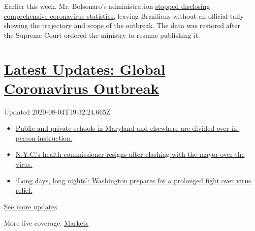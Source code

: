Earlier this week, Mr. Bolsonaro's administration
\href{https://www.nytimes3xbfgragh.onion/2020/06/08/world/americas/brazil-coronavirus-statistics.html}{stopped
disclosing comprehensive coronavirus statistics,} leaving Brazilians
without an official tally showing the trajectory and scope of the
outbreak. The data was restored after the Supreme Court ordered the
ministry to resume publishing it.

\hypertarget{latest-updates-global-coronavirus-outbreak}{%
\section{\texorpdfstring{\href{https://www.nytimes3xbfgragh.onion/2020/08/04/world/coronavirus-cases.html?action=click\&pgtype=Article\&state=default\&region=MAIN_CONTENT_1\&context=storylines_live_updates}{Latest
Updates: Global Coronavirus
Outbreak}}{Latest Updates: Global Coronavirus Outbreak}}\label{latest-updates-global-coronavirus-outbreak}}

Updated 2020-08-04T19:32:24.665Z

\begin{itemize}
\tightlist
\item
  \href{https://www.nytimes3xbfgragh.onion/2020/08/04/world/coronavirus-cases.html?action=click\&pgtype=Article\&state=default\&region=MAIN_CONTENT_1\&context=storylines_live_updates\#link-4825b93}{Public
  and private schools in Maryland and elsewhere are divided over
  in-person instruction.}
\item
  \href{https://www.nytimes3xbfgragh.onion/2020/08/04/world/coronavirus-cases.html?action=click\&pgtype=Article\&state=default\&region=MAIN_CONTENT_1\&context=storylines_live_updates\#link-4d1eafa8}{N.Y.C.'s
  health commissioner resigns after clashing with the mayor over the
  virus.}
\item
  \href{https://www.nytimes3xbfgragh.onion/2020/08/04/world/coronavirus-cases.html?action=click\&pgtype=Article\&state=default\&region=MAIN_CONTENT_1\&context=storylines_live_updates\#link-6b644638}{`Long
  days, long nights': Washington prepares for a prolonged fight over
  virus relief.}
\end{itemize}

\href{https://www.nytimes3xbfgragh.onion/2020/08/04/world/coronavirus-cases.html?action=click\&pgtype=Article\&state=default\&region=MAIN_CONTENT_1\&context=storylines_live_updates}{See
more updates}

More live coverage:
\href{https://www.nytimes3xbfgragh.onion/live/2020/08/04/business/stock-market-today-coronavirus?action=click\&pgtype=Article\&state=default\&region=MAIN_CONTENT_1\&context=storylines_live_updates}{Markets}

